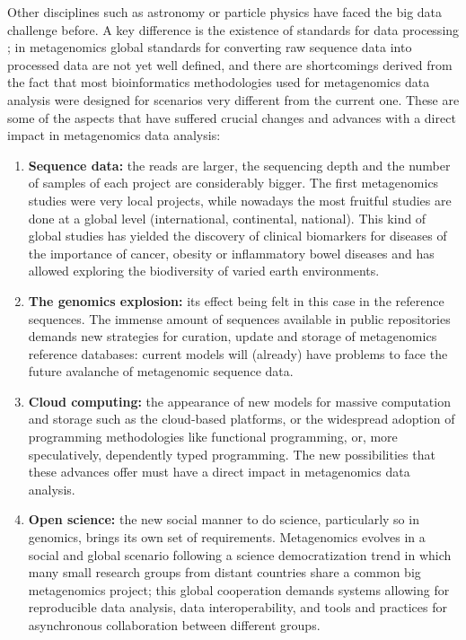 \documentclass[fontsize=8pt,paper=a4,pagesize,abstracton]{scrartcl}
\begin{document}
Other disciplines such as astronomy or particle physics have faced the
big data challenge before. A key difference is the existence of
standards for data processing \autocite{stephens2015big}; in
metagenomics global standards for converting raw sequence data into
processed data are not yet well defined, and there are shortcomings
derived from the fact that most bioinformatics methodologies used for
metagenomics data analysis were designed for scenarios very different
from the current one. These are some of the aspects that have suffered
crucial changes and advances with a direct impact in metagenomics data
analysis:

\begin{enumerate}
\def\labelenumi{\arabic{enumi}.}
\item
  \textbf{Sequence data:} the reads are larger, the sequencing depth and
  the number of samples of each project are considerably bigger. The
  first metagenomics studies were very local projects, while nowadays
  the most fruitful studies are done at a global level (international,
  continental, national). This kind of global studies has yielded the
  discovery of clinical biomarkers for diseases of the importance of
  cancer, obesity or inflammatory bowel diseases and has allowed
  exploring the biodiversity of varied earth environments.
\item
  \textbf{The genomics explosion:} its effect being felt in this case in
  the reference sequences. The immense amount of sequences available in
  public repositories demands new strategies for curation, update and
  storage of metagenomics reference databases: current models will
  (already) have problems to face the future avalanche of metagenomic
  sequence data.
\item
  \textbf{Cloud computing:} the appearance of new models for massive
  computation and storage such as the cloud-based platforms, or the
  widespread adoption of programming methodologies like functional
  programming, or, more speculatively, dependently typed programming.
  The new possibilities that these advances offer must have a direct
  impact in metagenomics data analysis.
\item
  \textbf{Open science:} the new social manner to do science,
  particularly so in genomics, brings its own set of requirements.
  Metagenomics evolves in a social and global scenario following a
  science democratization trend in which many small research groups from
  distant countries share a common big metagenomics project; this global
  cooperation demands systems allowing for reproducible data analysis,
  data interoperability, and tools and practices for asynchronous
  collaboration between different groups.
\end{enumerate}
\end{document}
